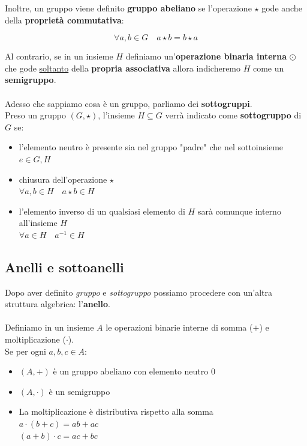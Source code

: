\documentclass[11pt]{article}
\begin{document}
Inoltre, un gruppo viene definito \textbf{gruppo abeliano} se l'operazione \(\star\) 
gode anche della \textbf{proprietà commutativa}:

\[ \forall a,b \in G \quad a \star b = b \star a\]

Al contrario, se in un insieme \(H\) definiamo un'\textbf{operazione binaria interna} \(\odot\) 
che gode \underline{soltanto} della \textbf{propria associativa} allora indicheremo \(H\)
come un \textbf{semigruppo}.
\\
\\
Adesso che sappiamo cosa è un gruppo, parliamo dei \textbf{sottogruppi}. \\
Preso un gruppo \((G, \star)\), l'insieme \(H \subseteq G\) verrà indicato 
come \textbf{sottogruppo} di \(G\) se:

\begin{itemize}
  \item l'elemento neutro è presente sia nel gruppo "padre" che nel sottoinsieme \\ 
  \(e \in G, H\)

  \item chiusura dell'operazione \(\star\) \\
  \(\forall a,b \in H \quad a \star b \in H\)

  \item l'elemento inverso di un qualsiasi elemento di \(H\) sarà
  comunque interno all'insieme \(H\) \\
  \( \forall a \in H \quad a^{-1} \in H\)
  
\end{itemize}

\subsection{Anelli e sottoanelli}
Dopo aver definito \emph{gruppo} e \emph{sottogruppo} possiamo 
procedere con un'altra struttura algebrica: l'\textbf{anello}.
\\
\\
Definiamo in un insieme \(A\) le operazioni binarie interne di somma 
(\(+\)) e moltiplicazione (\(\cdot\)). \\
Se per ogni \(a,b,c \in A\):

\begin{itemize}
  
  \item \( (A, +) \) è un gruppo abeliano con elemento neutro \(0\)
  \item \( (A, \cdot) \) è un semigruppo
  \item La moltiplicazione è distributiva rispetto alla somma \\
  \( a \cdot (b + c) = ab + ac\) \\
  \( (a + b) \cdot c = ac + bc\)

\end{itemize}
\end{document}
